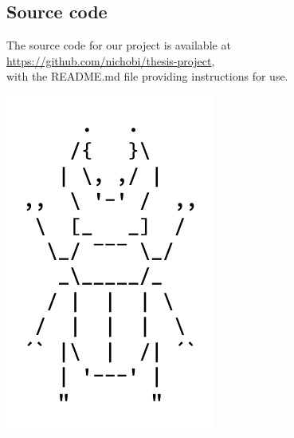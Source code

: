 \documentclass[nofilelist]{cslthse-msc}
\begin{document}
\begin{appendices} %
\chapter{Source code}
The source code for our project is available at \\\url{https://github.com/nichobi/thesis-project}, \\with the README.md file providing instructions for use.

\vspace*{\fill}
\hspace*{\fill}
\includegraphics[scale=0.2]{assets/stagbeetle.pdf}

\printfilelist

\checkoddpage
\ifoddpage
\else
  \newpage
  \thispagestyle{empty}
  \mbox{ }
\fi

\end{appendices}
\end{document}
